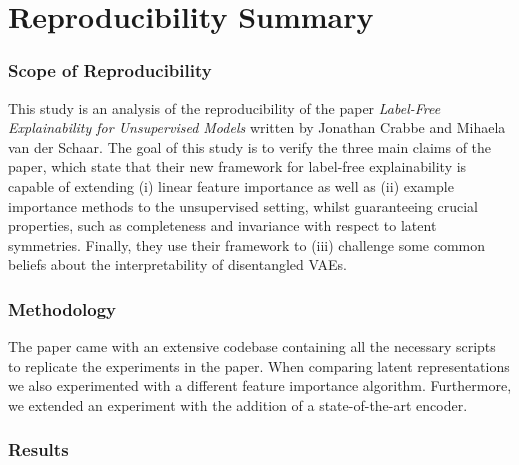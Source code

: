 \section*{\centering Reproducibility Summary}

\subsubsection*{Scope of Reproducibility}


This study is an analysis of the reproducibility of the paper \textit{Label-Free Explainability for Unsupervised Models} written by Jonathan Crabbe and Mihaela van der Schaar. The goal of this study is to verify the three main claims of the paper, which state that their new framework for label-free explainability is capable of extending (i) linear feature importance as well as (ii) example importance methods to the unsupervised setting, whilst guaranteeing crucial properties, such as completeness and invariance with respect to latent symmetries. Finally, they use their framework to (iii) challenge some common beliefs about the interpretability of disentangled VAEs.

\subsubsection*{Methodology}

The paper came with an extensive codebase containing all the necessary scripts to replicate the experiments in the paper. When comparing latent representations we also experimented with a different feature importance algorithm. Furthermore, we extended an experiment with the addition of a state-of-the-art encoder.

\subsubsection*{Results}


